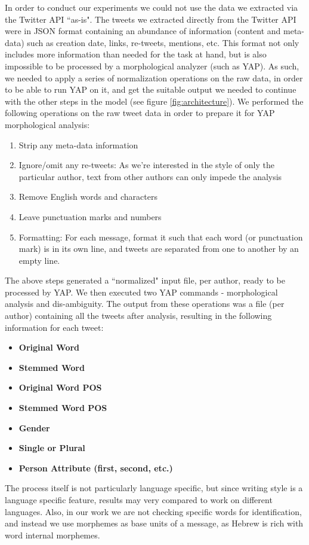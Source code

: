 \documentclass[a4paper]{article}
\begin{document}
In order to conduct our experiments we could not use the data we extracted via the Twitter API ``as-is". The tweets we extracted directly from the Twitter API were in JSON format containing an abundance of information (content and meta-data) such as creation date, links, re-tweets, mentions, etc. This format not only includes more information than needed for the task at hand, but is also impossible to be processed by a morphological analyzer (such as YAP). As such, we needed to apply a series of normalization operations on the raw data, in order to be able to run YAP on it, and get the suitable output we needed to continue with the other steps in the model (see figure \ref{fig:architecture}).
We performed the following operations on the raw tweet data in order to prepare it for YAP morphological analysis:\\
\begin{enumerate}
	\item Strip any meta-data information
	\item Ignore/omit any re-tweets: As we're interested in the style of only the particular author, text from other authors can only impede the analysis
	\item Remove English words and characters
	\item Leave punctuation marks and numbers
	\item Formatting: For each message, format it such that each word (or punctuation mark) is in its own line, and tweets are separated from one to another by an empty line.
\end{enumerate}
The above steps generated a ``normalized" input file, per author, ready to be processed by YAP. We then executed two YAP commands - morphological analysis and dis-ambiguity. The output from these operations was a file (per author) containing all the tweets after analysis, resulting in the following information for each tweet:\\
\begin{itemize}
\item \textbf{Original Word}
\item \textbf{Stemmed Word}
\item \textbf{Original Word POS}
\item \textbf{Stemmed Word POS}
\item \textbf{Gender}
\item \textbf{Single or Plural}
\item \textbf{Person Attribute (first, second, etc.)}
\end{itemize}
The process itself is not particularly language specific, but since writing style is a language specific feature, results may very compared to work on different languages. Also, in our work we are not checking specific words for identification, and instead we use morphemes as base units of a message, as Hebrew is rich with word internal morphemes.
\end{document}
